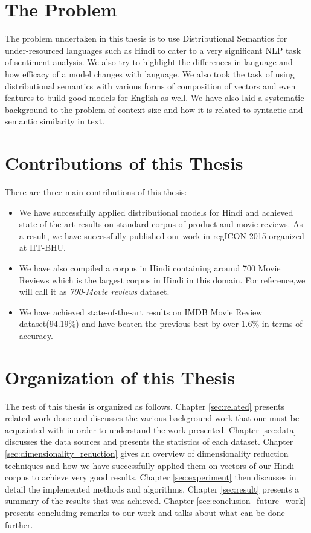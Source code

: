 \section{The Problem}
The problem undertaken in this thesis is to use Distributional Semantics for under-resourced languages such as Hindi to cater to a very significant NLP task of sentiment analysis. We also try to highlight the differences in language and how efficacy of a model changes with language. We also took the task of using distributional semantics with various forms of composition of vectors and even features to build good models for English as well. We have also laid a systematic background to the problem of context size and how it is related to syntactic and semantic similarity in text. 

\section{Contributions of this Thesis}
There are three main contributions of this thesis:
\begin{itemize}
\item We have successfully applied distributional models for Hindi and achieved state-of-the-art results on standard corpus of product and movie reviews. As a result, we have successfully published our work in regICON-2015 organized at IIT-BHU.
\item We have also compiled a corpus in Hindi containing around 700 Movie Reviews which is the largest corpus in Hindi in this domain. For reference,we will call it as \emph{700-Movie reviews} dataset.
\item We have achieved state-of-the-art results on IMDB Movie Review dataset(94.19\%) and have beaten the previous best by over 1.6\% in terms of accuracy.
\end{itemize}

\section{Organization of this Thesis}
The rest of this thesis is organized as follows. Chapter \ref{sec:related} presents related work done and discusses the various background work that one must be acquainted with in order to understand the work presented. Chapter \ref{sec:data} discusses the data sources and presents the statistics of each dataset. Chapter \ref{sec:dimensionality_reduction} gives an overview of dimensionality reduction techniques and how we have successfully applied them on vectors of our Hindi corpus to achieve very good results. Chapter \ref{sec:experiment} then discusses in detail the implemented methods and algorithms. Chapter \ref{sec:result} presents a summary of the results that was achieved. Chapter \ref{sec:conclusion_future_work} presents concluding remarks to our work and talks about what can be done further.
